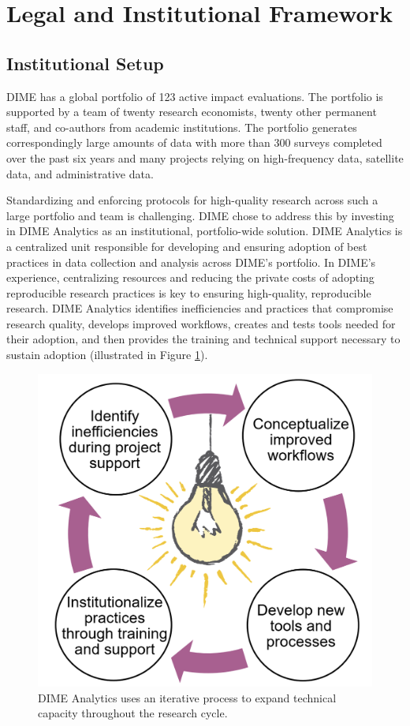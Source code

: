 \hypertarget{legal-and-institutional-framework-6}{%
\section{Legal and Institutional Framework}\label{legal-and-institutional-framework-6}}

\hypertarget{institutional-setup-6}{%
\subsection{Institutional Setup}\label{institutional-setup-6}}

DIME has a global portfolio of 123 active impact evaluations. The portfolio is supported by a team of twenty research economists, twenty other permanent staff, and co-authors from academic institutions. The portfolio generates correspondingly large amounts of data with more than 300 surveys completed over the past six years and many projects relying on high-frequency data, satellite data, and administrative data.

Standardizing and enforcing protocols for high-quality research across such a large portfolio and team is challenging. DIME chose to address this by investing in DIME Analytics as an institutional, portfolio-wide solution. DIME Analytics is a centralized unit responsible for developing and ensuring adoption of best practices in data collection and analysis across DIME's portfolio. In DIME's experience, centralizing resources and reducing the private costs of adopting reproducible research practices is key to ensuring high-quality, reproducible research. DIME Analytics identifies inefficiencies and practices that compromise research quality, develops improved workflows, creates and tests tools needed for their adoption, and then provides the training and technical support necessary to sustain adoption (illustrated in Figure \ref{fig:dimefigure3}).

\begin{figure}
\centering
\includegraphics[width=.7\linewidth]{./figures/dimefigure3} \caption{DIME Analytics uses an iterative process to expand technical capacity throughout the research cycle.}\label{fig:dimefigure3}
\end{figure}

